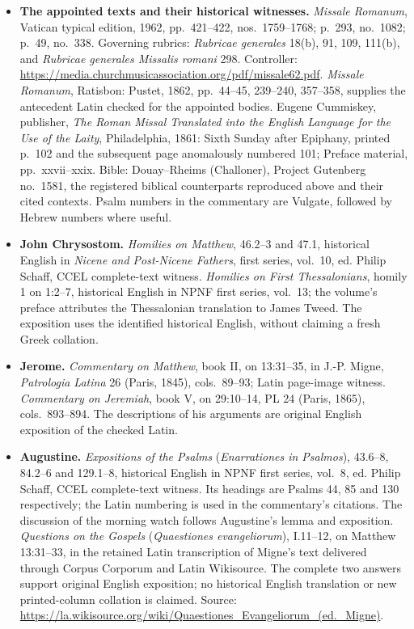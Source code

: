 \begin{itemize}
\item \textbf{The appointed texts and their historical witnesses.}
\textit{Missale Romanum}, Vatican typical edition, 1962, pp.~421--422, nos.~1759--1768; p.~293, no.~1082; p.~49, no.~338. Governing rubrics: \textit{Rubricae generales} 18(b), 91, 109, 111(b), and \textit{Rubricae generales Missalis romani} 298. Controller: \url{https://media.churchmusicassociation.org/pdf/missale62.pdf}.
\textit{Missale Romanum}, Ratisbon: Pustet, 1862, pp.~44--45, 239--240, 357--358, supplies the antecedent Latin checked for the appointed bodies. Eugene Cummiskey, publisher, \textit{The Roman Missal Translated into the English Language for the Use of the Laity}, Philadelphia, 1861: Sixth Sunday after Epiphany, printed p.~102 and the subsequent page anomalously numbered 101; Preface material, pp.~xxvii--xxix. Bible: Douay--Rheims (Challoner), Project Gutenberg no.~1581, the registered biblical counterparts reproduced above and their cited contexts. Psalm numbers in the commentary are Vulgate, followed by Hebrew numbers where useful.

\item \textbf{John Chrysostom.}
\textit{Homilies on Matthew}, 46.2--3 and 47.1, historical English in \textit{Nicene and Post-Nicene Fathers}, first series, vol.~10, ed. Philip Schaff, CCEL complete-text witness. \textit{Homilies on First Thessalonians}, homily 1 on 1:2--7, historical English in NPNF first series, vol.~13; the volume's preface attributes the Thessalonian translation to James Tweed. The exposition uses the identified historical English, without claiming a fresh Greek collation.

\item \textbf{Jerome.}
\textit{Commentary on Matthew}, book II, on 13:31--35, in J.-P. Migne, \textit{Patrologia Latina} 26 (Paris, 1845), cols.~89--93; Latin page-image witness. \textit{Commentary on Jeremiah}, book V, on 29:10--14, PL 24 (Paris, 1865), cols.~893--894. The descriptions of his arguments are original English exposition of the checked Latin.

\item \textbf{Augustine.}
\textit{Expositions of the Psalms} (\textit{Enarrationes in Psalmos}), 43.6--8, 84.2--6 and 129.1--8, historical English in NPNF first series, vol.~8, ed. Philip Schaff, CCEL complete-text witness. Its headings are Psalms 44, 85 and 130 respectively; the Latin numbering is used in the commentary's citations. The discussion of the morning watch follows Augustine's lemma and exposition.
\textit{Questions on the Gospels} (\textit{Quaestiones evangeliorum}), I.11--12, on Matthew 13:31--33, in the retained Latin transcription of Migne's text delivered through Corpus Corporum and Latin Wikisource. The complete two answers support original English exposition; no historical English translation or new printed-column collation is claimed. Source: \url{https://la.wikisource.org/wiki/Quaestiones_Evangeliorum_(ed._Migne)}.


\end{itemize}
